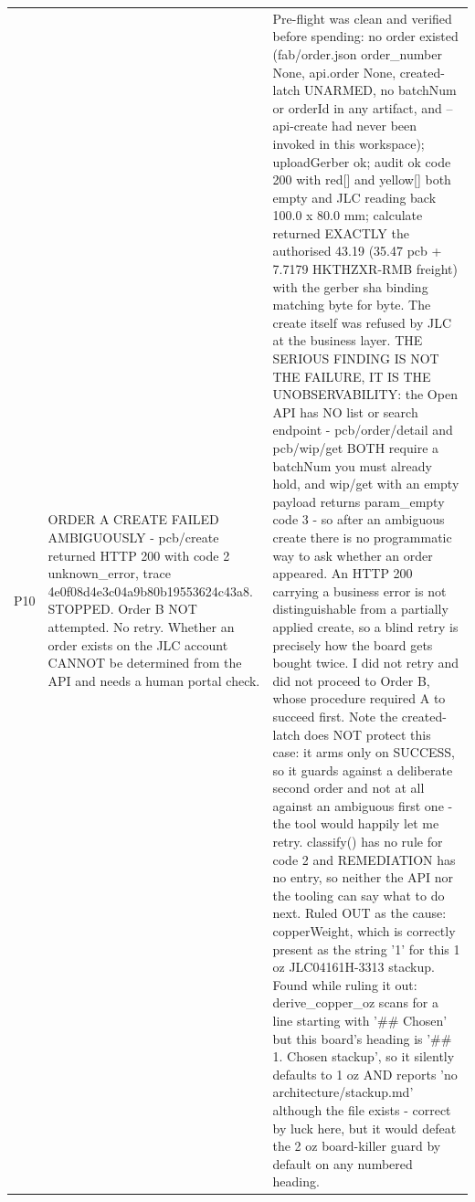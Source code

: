 \documentclass[11pt,a4paper]{article}
\begin{document}
{\begin{longtable}{lp{5.2cm}p{7.2cm}}
P10 & ORDER A CREATE FAILED AMBIGUOUSLY - pcb/create returned HTTP 200 with code 2 unknown\_error, trace 4e0f08d4e3c04a9b80b19553624c43a8. STOPPED. Order B NOT attempted. No retry. Whether an order exists on the JLC account CANNOT be determined from the API and needs a human portal check. & Pre-flight was clean and verified before spending: no order existed (fab/order.json order\_number None, api.order None, created-latch UNARMED, no batchNum or orderId in any artifact, and --api-create had never been invoked in this workspace); uploadGerber ok; audit ok code 200 with red{[}{]} and yellow{[}{]} both empty and JLC reading back 100.0 x 80.0 mm; calculate returned EXACTLY the authorised 43.19 (35.47 pcb + 7.7179 HKTHZXR-RMB freight) with the gerber sha binding matching byte for byte. The create itself was refused by JLC at the business layer. THE SERIOUS FINDING IS NOT THE FAILURE, IT IS THE UNOBSERVABILITY: the Open API has NO list or search endpoint - pcb/order/detail and pcb/wip/get BOTH require a batchNum you must already hold, and wip/get with an empty payload returns param\_empty code 3 - so after an ambiguous create there is no programmatic way to ask whether an order appeared. An HTTP 200 carrying a business error is not distinguishable from a partially applied create, so a blind retry is precisely how the board gets bought twice. I did not retry and did not proceed to Order B, whose procedure required A to succeed first. Note the created-latch does NOT protect this case: it arms only on SUCCESS, so it guards against a deliberate second order and not at all against an ambiguous first one - the tool would happily let me retry. classify() has no rule for code 2 and REMEDIATION has no entry, so neither the API nor the tooling can say what to do next. Ruled OUT as the cause: copperWeight, which is correctly present as the string '1' for this 1 oz JLC04161H-3313 stackup. Found while ruling it out: derive\_copper\_oz scans for a line starting with '\#\# Chosen' but this board's heading is '\#\# 1. Chosen stackup', so it silently defaults to 1 oz AND reports 'no architecture/stackup.md' although the file exists - correct by luck here, but it would defeat the 2 oz board-killer guard by default on any numbered heading. \\

\end{longtable}}
\end{document}
